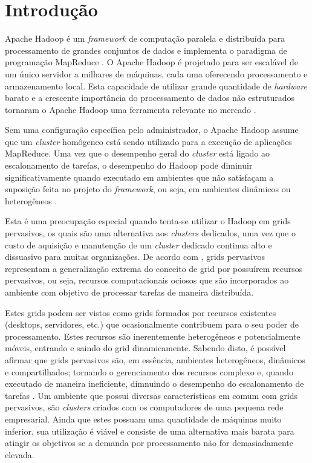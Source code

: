 \chapter{Introdução}
\label{chap:Intro}
Apache Hadoop é um \textit{framework} de computação paralela e distribuída para processamento de grandes conjuntos de dados e implementa o paradigma de programação \mbox{MapReduce} \cite{Dean2008}. O Apache Hadoop é projetado para ser escalável de um único servidor a milhares de máquinas, cada uma oferecendo processamento e armazenamento local. Esta capacidade de utilizar grande quantidade de \textit{hardware} barato e a crescente importância do processamento de dados não estruturados tornaram o Apache Hadoop uma ferramenta relevante no mercado \cite{Su}.

%
%

Sem uma configuração específica pelo administrador, o Apache Hadoop assume que um \textit{cluster} homôgeneo está sendo utilizado para a execução de aplicações MapReduce. Uma vez que o desempenho geral do \textit{cluster} está ligado ao escalonamento de tarefas, o desempenho do Hadoop pode diminuir significativamente quando executado em ambientes que não satisfaçam a suposição feita no projeto do \textit{framework}, ou seja, em ambientes dinâmicos ou heterogêneos \cite{Kumar2012}.

Esta é uma preocupação especial quando tenta-se utilizar o Hadoop em grids pervasivos, os quais são uma alternativa aos \textit{clusters} dedicados, uma vez que o custo de aquisição e manutenção de um \textit{cluster} dedicado continua alto e dissuasivo para muitas organizações. De acordo com \citet{Parashar2010}, grids pervasivos representam a generalização  extrema do conceito de grid por possuírem recursos pervasivos, ou seja, recursos computacionais ociosos que são incorporados ao ambiente com objetivo de processar tarefas de maneira distribuída. 

Estes grids podem ser vistos como grids formados por recursos existentes (desktops, servidores, etc.) que ocasionalmente contribuem para o seu poder de processamento. Estes recursos são inerentemente heterogêneos e potencialmente móveis, entrando e saindo do grid dinamicamente. Sabendo disto, é possível afirmar que grids pervasivos são, em essência, ambientes heterogêneos, dinâmicos e compartilhados; tornando o gerenciamento dos recursos complexo e, quando executado de maneira ineficiente, dimnuindo  o desempenho do escalonamento de tarefas \cite{Nascimento}. Um ambiente que possui diversas características em comum com grids pervasivos, são \textit{clusters} criados com os computadores de uma pequena rede empresarial. Ainda que estes possuam uma quantidade de máquinas muito inferior, sua utilização é viável e consiste de uma alternativa mais barata para atingir os objetivos se a demanda por processamento não for demasiadamente elevada.

